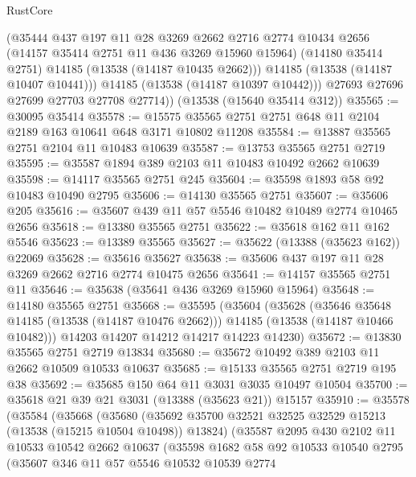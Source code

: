 \begin{lexlean}{RustCore}
\begin{coremodule}
            (@35444
              @437
              @197
              @11
              @28
              @3269
              @2662
              @2716
              @2774
              @10434
              @2656
              (@14157 @35414 @2751 @11 @436 @3269 @15960 @15964)
              (@14180 @35414 @2751)
              @14185
              (@13538 (@14187 @10435 @2662)))
            @14185
            (@13538 (@14187 @10407 @10441)))
          @14185
          (@13538 (@14187 @10397 @10442)))
        @27693
        @27696
        @27699
        @27703
        @27708
        @27714))
    (@13538 (@15640 @35414 @312))
@35565 := @30095 @35414
@35578 := @15575 @35565 @2751 @2751 @648 @11 @2104 @2189 @163 @10641 @648 @3171 @10802 @11208
@35584 := @13887 @35565 @2751 @2104 @11 @10483 @10639
@35587 := @13753 @35565 @2751 @2719
@35595 := @35587 @1894 @389 @2103 @11 @10483 @10492 @2662 @10639
@35598 := @14117 @35565 @2751 @245
@35604 := @35598 @1893 @58 @92 @10483 @10490 @2795
@35606 := @14130 @35565 @2751
@35607 := @35606 @205
@35616 := @35607 @439 @11 @57 @5546 @10482 @10489 @2774 @10465 @2656
@35618 := @13380 @35565 @2751
@35622 := @35618 @162 @11 @162 @5546
@35623 := @13389 @35565
@35627 := @35622 (@13388 (@35623 @162)) @22069
@35628 := @35616 @35627
@35638 := @35606 @437 @197 @11 @28 @3269 @2662 @2716 @2774 @10475 @2656
@35641 := @14157 @35565 @2751 @11
@35646 := @35638 (@35641 @436 @3269 @15960 @15964)
@35648 := @14180 @35565 @2751
@35668 := @35595
    (@35604
      (@35628
        (@35646 @35648 @14185 (@13538 (@14187 @10476 @2662)))
        @14185
        (@13538 (@14187 @10466 @10482)))
      @14203
      @14207
      @14212
      @14217
      @14223
      @14230)
@35672 := @13830 @35565 @2751 @2719 @13834
@35680 := @35672 @10492 @389 @2103 @11 @2662 @10509 @10533 @10637
@35685 := @15133 @35565 @2751 @2719 @195 @38
@35692 := @35685 @150 @64 @11 @3031 @3035 @10497 @10504
@35700 := @35618 @21 @39 @21 @3031 (@13388 (@35623 @21)) @15157
@35910 := @35578
    (@35584
      (@35668
        (@35680
          (@35692 @35700 @32521 @32525 @32529 @15213 (@13538 (@15215 @10504 @10498)) @13824)
          (@35587
            @2095
            @430
            @2102
            @11
            @10533
            @10542
            @2662
            @10637
            (@35598
              @1682
              @58
              @92
              @10533
              @10540
              @2795
              (@35607
                @346
                @11
                @57
                @5546
                @10532
                @10539
                @2774

\end{coremodule}
\end{lexlean}
